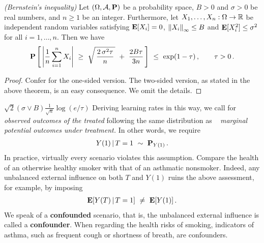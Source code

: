 \begin{theorem}
  \emph{(Bernstein's inequality)}
  Let
  $
  (\Omega,\mathcal{A},\P)
  $ 
  be a probability space, 
  $
  B>0
  $ 
  and
  $
  \sigma>0
  $
  be real numbers,
  and
  $
  n\ge 1
  $
  be an integer.
  Furthermore, 
  let
  $
  X_1,\ldots,X_n
  :
  \Omega
  \to
  \R
  $
  be independent random variables satisfying
  $
  \E[X_i]=0
  $,
  $
  \norm{X_i}_\infty
  \le
  B
  $
  and
  $
  \E[X_i^2]\le \sigma^2
  $
  for all 
  $
  i=1,\ldots,n
  $.
  Then we have
  \begin{gather*}
    \P
    \left[ 
      \,
      \left| 
      \frac{1}{n}
        \sum_{i=1}^{n} 
        X_i
      \right|
      \ 
      \ge
      \ 
      \sqrt{
        \,
        \frac{2\,\sigma^2 \tau}{n}
        \,
      }
      \ 
      +
      \
      \frac{2 B \tau}{3n}
      \,
    \right]
    \ 
    \le
    \ 
    \exp(1-\tau)
    \,
    ,
    \qquad
    \tau>0\,.
  \end{gather*}
\end{theorem}
\begin{proof}
  Confer \cite[Theorem~6.12]{Steinwart2008}
  for the one-sided version. 
  The two-sided version, as stated in the above theorem, is an easy consequence. We omit the details.
\end{proof}
$
\sqrt{2}(\sigma\lor B)\frac{1}{\sqrt{n}}
\log(e/\tau)
$
Deriving learning rates in this way, we call for \textit{observed outcomes of the treated}
following the same distribution as
~\textit{
marginal potential outcomes under treatment.}
In other words, we require
\begin{gather}
  Y(1)\,|\,T=1
  \ 
  \sim 
  \ 
  \P_
  {
  Y(1)
  }
  \,.
\end{gather}
In practice, virtually every scenario violates this assumption.
Compare the health of an otherwise healthy smoker with that of an asthmatic nonsmoker.
  Indeed, any unbalanced external influence on both $T$ and $Y(1)$ ruins the 
above assessment, for example, by imposing 
\begin{gather}
  \E[Y(T)\,|\, T=1]\ \neq\  \E[Y(1)]
  \,.
\end{gather}
We speak of a \textbf{confounded} scenario, that is, the unbalanced external influence is called a \textbf{confounder}. 
When regarding the health risks of smoking, indicators of asthma, such as frequent cough or shortness of breath, are confounders.

